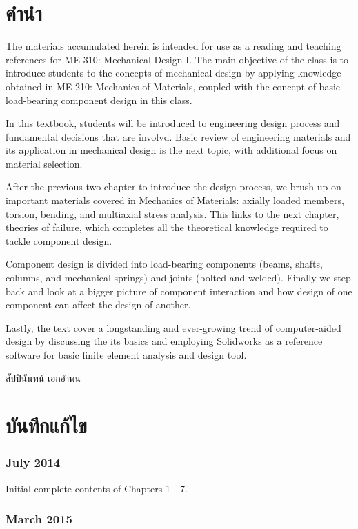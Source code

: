 \documentclass[a4paper,openany,12pt]{book}
\begin{document}
\chapter*{คำนำ}
\label{sec:org8332cb6}
The materials accumulated herein is intended for use as a reading and
teaching references for ME 310: Mechanical Design I. The main objective
of the class is to introduce students to the concepts of mechanical
design by applying knowledge obtained in ME 210: Mechanics of Materials,
coupled with the concept of basic load-bearing component design in this
class.

In this textbook, students will be introduced to engineering design
process and fundamental decisions that are involvd. Basic review of
engineering materials and its application in mechanical design is the
next topic, with additional focus on material selection.

After the previous two chapter to introduce the design process, we brush
up on important materials covered in Mechanics of Materials: axially
loaded members, torsion, bending, and multiaxial stress analysis. This
links to the next chapter, theories of failure, which completes all the
theoretical knowledge required to tackle component design.

Component design is divided into load-bearing components (beams, shafts,
columns, and mechanical springs) and joints (bolted and welded). Finally
we step back and look at a bigger picture of component interaction and
how design of one component can affect the design of another.

Lastly, the text cover a longstanding and ever-growing trend of
computer-aided design by discussing the its basics and employing
Solidworks as a reference software for basic finite element analysis and
design tool.

\vspace{2cm}
\hspace{10cm}
สัปปินันทน์ เอกอำพน

\chapter*{บันทึกแก้ไข}
\label{sec:orge0f3936}
\subsection*{July 2014}
\label{sec:org337ef07}

Initial complete contents of Chapters 1 - 7.

\subsection*{March 2015}
\label{sec:orgff5665e}
\end{document}
